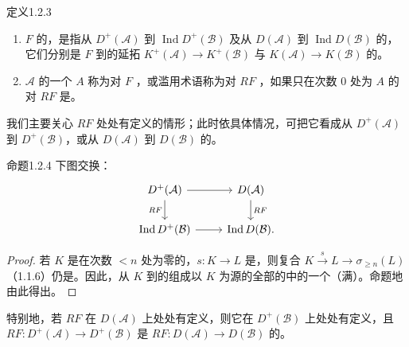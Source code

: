 \begin{SGAresult}{定义}{1.2.3}
\begin{enumerate}
\item[(i)] $F$ 的，是指从 $D^+(\mathcal A)$ 到 $\operatorname{Ind}D^+(\mathcal B)$ 及从 $D(\mathcal A)$ 到 $\operatorname{Ind}D(\mathcal B)$ 的，它们分别是 $F$ 到的延拓 $K^+(\mathcal A)\to K^+(\mathcal B)$ 与 $K(\mathcal A)\to K(\mathcal B)$ 的。
\item[(ii)] $\mathcal A$ 的一个 $A$ 称为对 $F$ ，或滥用术语称为对 $RF$ ，如果只在次数 $0$ 处为 $A$ 的对 $RF$ 是。
\end{enumerate}
\end{SGAresult}
我们主要关心 $RF$ 处处有定义的情形；此时依具体情况，可把它看成从 $D^+(\mathcal A)$ 到 $D^+(\mathcal B)$，或从 $D(\mathcal A)$ 到 $D(\mathcal B)$ 的。

\begin{SGAresult}{命题}{1.2.4}
下图交换：
\[
\begin{tikzcd}
D^+(\mathcal A)\arrow[r]\arrow[d,"RF"']&D(\mathcal A)\arrow[d,"RF"]\\
\operatorname{Ind}D^+(\mathcal B)\arrow[r]&\operatorname{Ind}D(\mathcal B).
\end{tikzcd}
\]
\end{SGAresult}
\begin{proof}
若 $K$ 是在次数 $<n$ 处为零的，$s:K\to L$ 是，则复合 $K\xrightarrow{s}L\to\sigma_{\ge n}(L)$（1.1.6）仍是。因此，从 $K$ 到的组成以 $K$ 为源的全部的中的一个（满）。命题地由此得出。
\end{proof}
特别地，若 $RF$ 在 $D(\mathcal A)$ 上处处有定义，则它在 $D^+(\mathcal B)$ 上处处有定义，且 $RF:D^+(\mathcal A)\to D^+(\mathcal B)$ 是 $RF:D(\mathcal A)\to D(\mathcal B)$ 的。

